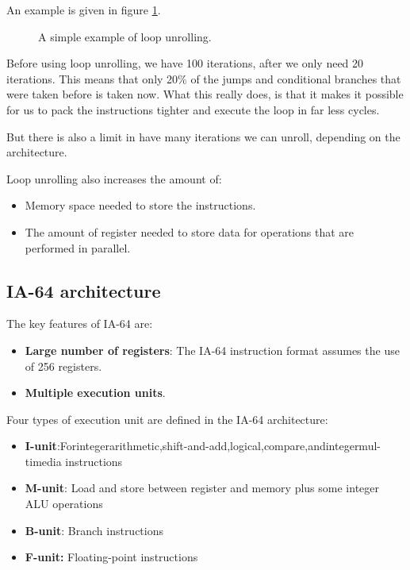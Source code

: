 An example is given in figure \ref{fig:loop-unrolling}.
\begin{figure}[H]
  \centering
  \caption{A simple example of loop unrolling.}
  \label{fig:loop-unrolling}
\end{figure}

Before using loop unrolling, we have 100 iterations, after we only need 20 iterations. This means that only 20\% of the jumps and conditional branches that were taken before is taken now. What this really does, is that it makes it possible for us to pack the instructions tighter and execute the loop in far less cycles.

But there is also a limit in have many iterations we can unroll, depending on the architecture.

Loop unrolling also increases the amount of:
\begin{itemize}
\item Memory space needed to store the instructions.
\item The amount of register needed to store data for operations that are performed in parallel.
\end{itemize}

\subsection{IA-64 architecture}
The key features of IA-64 are:
\begin{itemize}
\item \textbf{Large number of registers}: The IA-64 instruction format assumes the use of 256 registers.
\item \textbf{Multiple execution units}.
\newline
\end{itemize}

Four types of execution unit are defined in the IA-64 architecture:
\begin{itemize}
\item \textbf{I-unit}:Forintegerarithmetic,shift-and-add,logical,compare,andintegermul- timedia instructions
\item \textbf{M-unit}: Load and store between register and memory plus some integer ALU operations
\item \textbf{B-unit}: Branch instructions
\item \textbf{F-unit:} Floating-point instructions
\end{itemize}

